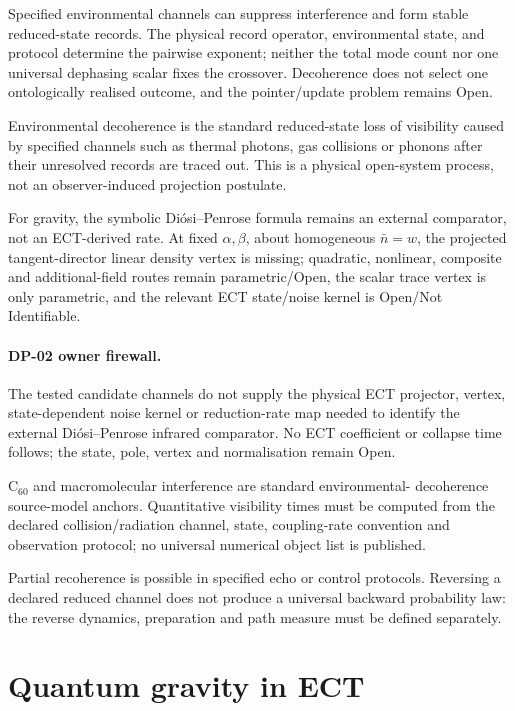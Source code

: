 \documentclass[11pt,a4paper]{article}
\begin{document}
Specified environmental channels can suppress interference and form stable
reduced-state records.  The physical record operator, environmental state,
and protocol determine the pairwise exponent; neither the total mode count nor
one universal dephasing scalar fixes the crossover.  Decoherence does
not select one ontologically realised outcome, and the pointer/update problem
remains Open.

Environmental decoherence is the standard reduced-state loss of visibility
caused by specified channels such as thermal photons, gas collisions or
phonons after their unresolved records are traced out.  This is a physical
open-system process, not an observer-induced projection postulate.

For gravity, the symbolic Di\'osi--Penrose formula remains an external
comparator, not an ECT-derived rate.  At fixed $\alpha,\beta$, about homogeneous $\bar n=w$, the projected tangent-director linear density vertex is missing; quadratic, nonlinear, composite and additional-field routes remain parametric/Open, the scalar trace vertex is only parametric, and the relevant ECT
state/noise kernel is Open/Not Identifiable.

\paragraph{DP-02 owner firewall.}
The tested candidate channels do not supply the physical ECT projector,
vertex, state-dependent noise kernel or reduction-rate map needed to identify
the external Di\'osi--Penrose infrared comparator.  No ECT coefficient or
collapse time follows; the state, pole, vertex and normalisation remain Open.

C$_{60}$ and macromolecular interference are standard environmental-
decoherence source-model anchors.  Quantitative visibility times must be
computed from the declared collision/radiation channel, state, coupling-rate
convention and observation protocol; no universal numerical object list is
published.

Partial recoherence is possible in specified echo or control protocols.
Reversing a declared reduced channel does not produce a universal backward
probability law: the reverse dynamics, preparation and path measure must be
defined separately.

\section{Quantum gravity in ECT}
\label{sec:pop_qg}
\end{document}
